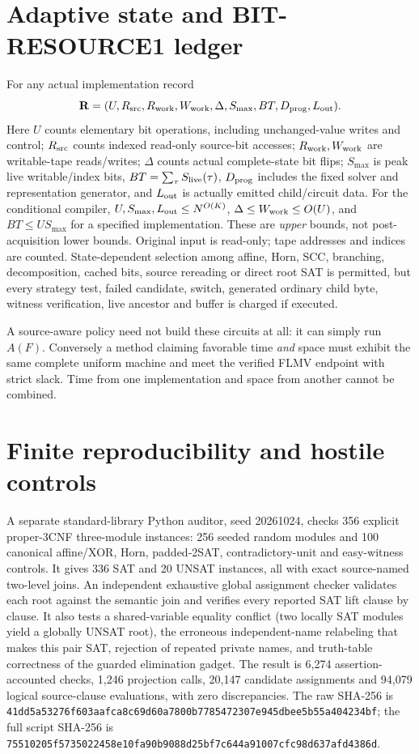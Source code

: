 \documentclass[11pt]{article}
\begin{document}
\section{Adaptive state and BIT-RESOURCE1 ledger}
For any actual implementation record
\[
\mathbf R=(U,R_{\rm src},R_{\rm work},W_{\rm work},
\Delta,S_{\max},BT,D_{\rm prog},L_{\rm out}).
\]
Here \(U\) counts elementary bit operations, including unchanged-value writes and control; \(R_{\rm src}\) counts indexed read-only source-bit accesses; \(R_{\rm work},W_{\rm work}\) are writable-tape reads/writes; \(\Delta\) counts actual complete-state bit flips; \(S_{\max}\) is peak live writable/index bits, \(BT=\sum_{\tau}S_{\rm live}(\tau)\), \(D_{\rm prog}\) includes the fixed solver and representation generator, and \(L_{\rm out}\) is actually emitted child/circuit data. For the conditional compiler, \(U,S_{\max},L_{\rm out}\le N^{O(K)}\), \(\Delta\le W_{\rm work}\le O(U)\), and \(BT\le U S_{\max}\) for a specified implementation. These are \emph{upper} bounds, not post-acquisition lower bounds. Original input is read-only; tape addresses and indices are counted. State-dependent selection among affine, Horn, SCC, branching, decomposition, cached bits, source rereading or direct root SAT is permitted, but every strategy test, failed candidate, switch, generated ordinary child byte, witness verification, live ancestor and buffer is charged if executed.

A source-aware policy need not build these circuits at all: it can simply run \(A(F)\). Conversely a method claiming favorable time \emph{and} space must exhibit the same complete uniform machine and meet the verified FLMV endpoint with strict slack. Time from one implementation and space from another cannot be combined.

\section{Finite reproducibility and hostile controls}
A separate standard-library Python auditor, seed 20261024, checks 356 explicit proper-3CNF three-module instances: 256 seeded random modules and 100 canonical affine/XOR, Horn, padded-2SAT, contradictory-unit and easy-witness controls. It gives 336 SAT and 20 UNSAT instances, all with exact source-named two-level joins. An independent exhaustive global assignment checker validates each root against the semantic join and verifies every reported SAT lift clause by clause. It also tests a shared-variable equality conflict (two locally SAT modules yield a globally UNSAT root), the erroneous independent-name relabeling that makes this pair SAT, rejection of repeated private names, and truth-table correctness of the guarded elimination gadget. The result is 6,274 assertion-accounted checks, 1,246 projection calls, 20,147 candidate assignments and 94,079 logical source-clause evaluations, with zero discrepancies. The raw SHA-256 is \texttt{41dd5a53276f603aafca8c69d60a7800b7785472307e945dbee5b55a404234bf}; the full script SHA-256 is \texttt{75510205f5735022458e10fa90b9088d25bf7c644a91007cfc98d637afd4386d}.
\end{document}
